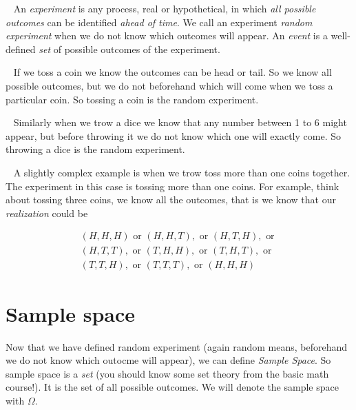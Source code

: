 \documentclass[ 11pt,%
				a4paper,%
				oneside,%
				headinclude,%
				footinclude = true,%
				cleardoublepage = empty,%
				reqno]{scrbook}
\begin{document}
	\begin{definition}~\label{def:re}
		An \emph{experiment} is any process, real or hypothetical, in which \emph{all possible outcomes} can be identified \emph{ahead of time}. We call an experiment \emph{random experiment} when we do not know which outcomes will appear. An \emph{event} is a well-defined \emph{set} of possible outcomes of the experiment.
	\end{definition}

	\begin{example}~\label{ex:tosscoin}
		If we toss a coin we know the outcomes can be head or tail. So we know all possible outcomes, but we do not beforehand which will come when we toss a particular coin. So tossing a coin is the random experiment.
	\end{example}


	\begin{example}~\label{ex:throwdice}
		Similarly when we trow a dice we know that any number between 1 to 6 might appear, but before throwing it we do not know which one will exactly come. So throwing a dice is the random experiment.
	\end{example}

	\begin{example}~\label{ex:tossmulticoin}
		A slightly complex example is when we trow toss more than one coins together. The experiment in this case is tossing more than one coins. For example, think about tossing three coins, we know all the outcomes, that is we know that our \emph{realization} could be

		\begin{align*}
		(H, H, H) \text{ or } (H, H, T), \text{ or } (H, T, H), \text{ or } \\
		(H, T, T), \text{ or } (T, H, H), \text{ or } (T, H, T), \text{ or } \\
		(T, T, H), \text{ or } (T, T, T), \text{ or } (H, H, H)
		\end{align*}
	\end{example}

		
	\section{Sample space}
		Now that we have defined random experiment (again random means, beforehand we do not know which outocme will appear), we can define \emph{Sample Space}. So sample space is a \emph{set} (you should know some set theory from the basic math course!). It is the set of all possible outcomes. We will denote the sample space with $\Omega$.
\end{document}

